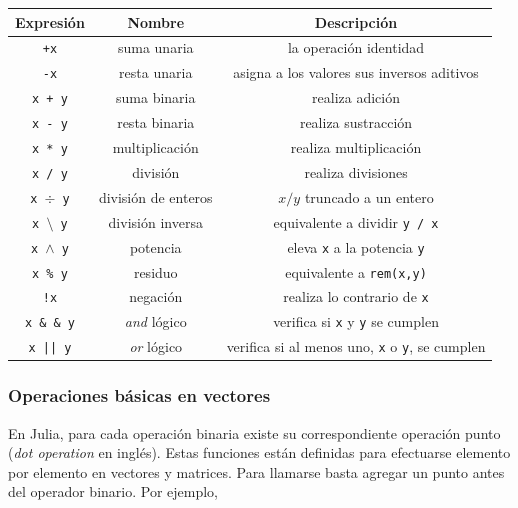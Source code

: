 \begin{center}
	\begin{tabular}{|c|c|c|} 
		\hline
		Expresión & Nombre & Descripción \\ 
		\hline 
		\texttt{+x} & suma unaria & la operación identidad \\ 

		\texttt{-x} & resta unaria & asigna a los valores sus inversos aditivos \\ 

		\texttt{x + y} & suma binaria & realiza adición \\ 

		\texttt{x - y} & resta binaria & realiza sustracción \\

		\texttt{x * y} & multiplicación & realiza multiplicación \\

		\texttt{x / y} & división & realiza divisiones \\

		\texttt{x $\div$ y} & división de enteros & $x / y$ truncado a un entero \\

		\texttt{x $\setminus$ y} & división inversa & equivalente a dividir \texttt{y / x} \\

		\texttt{x $\wedge$ y} & potencia & eleva \texttt{x} a la potencia \texttt{y} \\

		\texttt{x \% y} & residuo & equivalente a \texttt{rem(x,y)} \\
		
		\texttt{!x} & negación & realiza lo contrario de \texttt{x} \\
		
		\texttt{x \& \& y} & \textit{and} lógico & verifica si \texttt{x} y \texttt{y} se cumplen \\
		
		\texttt{x || y} & \textit{or} lógico & verifica si al menos uno, \texttt{x} o \texttt{y},  se cumplen \\
		\hline
	\end{tabular} 
	 \label{operaciones_basicas_julia}
\end{center}


\subsubsection{Operaciones básicas en vectores}
En \textsf{Julia}, para cada operación binaria existe su correspondiente operación punto (\textit{dot operation} en inglés). Estas funciones están definidas para efectuarse elemento por elemento en vectores y matrices. Para llamarse basta agregar un punto antes del operador binario. Por ejemplo,

